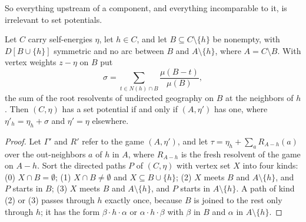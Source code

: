 \documentclass[final]{siamart0516}
\numberwithin{theorem}{section}
\numberwithin{equation}{section}
\theoremstyle{siamnonum}
\theoremstyle{plain}
\begin{document}
So everything upstream of a component, and everything incomparable to it, is irrelevant to set potentials.

\begin{lemma}\label{lem:branches}
Let $C$ carry self-energies $\eta$, let $h\in C$, and let $B\subseteq C\setminus\{h\}$ be nonempty, with $D[B\cup\{h\}]$ symmetric and no arc between $B$ and $A\setminus\{h\}$, where $A=C\setminus B$. With vertex weights $z-\eta$ on $B$ put
\[
\sigma=\sum_{t\in N(h)\cap B}\frac{\mu(B-t)}{\mu(B)},
\]
the sum of the root resolvents of undirected geography on $B$ at the neighbors of $h$. Then $(C,\eta)$ has a set potential if and only if $(A,\eta')$ has one, where $\eta'_h=\eta_h+\sigma$ and $\eta'=\eta$ elsewhere.
\end{lemma}
\begin{proof}
Let $\Gamma'$ and $R'$ refer to the game $(A,\eta')$, and let $\tau=\eta_h+\sum_aR_{A-h}(a)$ over the out-neighbors $a$ of $h$ in $A$, where $R_{A-h}$ is the fresh resolvent of the game on $A-h$. Sort the directed paths $P$ of $(C,\eta)$ with vertex set $X$ into four kinds: (0) $X\cap B=\emptyset$; (1) $X\cap B\neq\emptyset$ and $X\subseteq B\cup\{h\}$; (2) $X$ meets $B$ and $A\setminus\{h\}$, and $P$ starts in $B$; (3) $X$ meets $B$ and $A\setminus\{h\}$, and $P$ starts in $A\setminus\{h\}$. A path of kind (2) or (3) passes through $h$ exactly once, because $B$ is joined to the rest only through $h$; it has the form $\beta\cdot h\cdot\alpha$ or $\alpha\cdot h\cdot\beta$ with $\beta$ in $B$ and $\alpha$ in $A\setminus\{h\}$.


\end{proof}
\end{document}
